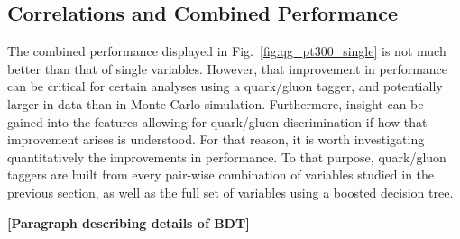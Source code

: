 \subsection{Correlations and Combined Performance}\label{sec:qg_combi}
The combined performance displayed in Fig.~\ref{fig:qg_pt300_single} is not much
better than that of single variables. However, that improvement in performance can
be critical for certain analyses using a quark/gluon tagger, and potentially larger in
data than in Monte Carlo simulation. Furthermore, insight can be gained into the 
features allowing for quark/gluon discrimination if how that improvement arises is
understood. For that reason, it is worth investigating quantitatively
the improvements in performance. To that purpose, quark/gluon taggers are built from
every pair-wise combination of variables studied in the previous section, as well as
the full set of variables using a boosted decision tree. 

{\bf [Paragraph describing details of BDT]}


